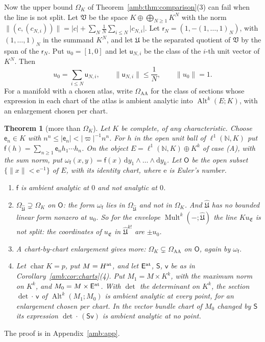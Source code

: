 \documentclass[11pt]{amsart}
\newtheorem{theorem}{Theorem}[section]
\theoremstyle{definition}
\theoremstyle{remark}
\numberwithin{equation}{section}
\newcommand{\N}{\mathbb N}
\newcommand{\Alt}{\operatorname{Alt}}
\newcommand{\Mult}{\operatorname{Mult}}
\newcommand{\abs}[1]{\lvert #1\rvert}
\newcommand{\norm}[1]{\lVert #1\rVert}
\theoremstyle{plain}
\theoremstyle{definition}
\theoremstyle{plain}
\begin{document}
Now the upper bound $\Omega_K$ of Theorem~\ref{amb:thm:comparison}(3) can fail when the line is not split. Let $\mathfrak V$ be the space $K\oplus\bigoplus_{N\ge1}K^N$ with the norm $\norm{(c,(c_{N,i}))}=\abs c+\sum_N\frac1N\sum_{i\le N}\abs{c_{N,i}}$. Let $\mathsf r_N=(1,-(1,\dots,1)_N)$, with $(1,\dots,1)_N$ in the summand $K^N$, and let $\mathfrak U$ be the separated quotient of $\mathfrak V$ by the span of the $\mathsf r_N$. Put $u_0=[1,0]$ and let $\mathsf u_{N,i}$ be the class of the $i$-th unit vector of $K^N$. Then
\begin{equation}\label{amb:c:frakU}
 u_0=\sum_{i\le N}\mathsf u_{N,i},\qquad\norm{\mathsf u_{N,i}}\le\frac1N,\qquad\norm{u_0}=1.
\end{equation}
For a manifold with a chosen atlas, write $\Omega_{\mathrm{AA}}$ for the class of sections whose expression in each chart of the atlas is ambient analytic into $\Alt^k(E;K)$, with an enlargement chosen per chart.

\begin{theorem}[more than $\Omega_K$]\label{amb:thm:more}
Let $K$ be complete, of any characteristic. Choose $\mathsf e_n\in K$ with $n^n\le\abs{\mathsf e_n}<\abs\varpi^{-1}n^n$. For $h$ in the open unit ball of $\ell^1(\N,K)$ put $\mathsf f(h)=\sum_{n\ge1}\mathsf e_nh_1\cdots h_n$. On the object $E=\ell^1(\N,K)\oplus K^k$ of case (A), with the sum norm, put $\omega_{\mathsf f}(x,y)=\mathsf f(x)\,\mathrm dy_1\wedge\dots\wedge\mathrm dy_k$. Let $\mathsf O$ be the open subset $\{\norm x<\mathrm e^{-1}\}$ of $E$, with its identity chart, where $\mathrm e$ is Euler's number.
\begin{enumerate}
\item $\mathsf f$ is ambient analytic at $0$ and not analytic at $0$.
\item $\Omega_{\widehat{\mathfrak U}}\supsetneq\Omega_K$ on $\mathsf O$: the form $\omega_{\mathsf f}$ lies in $\Omega_{\widehat{\mathfrak U}}$ and not in $\Omega_K$. And $\widehat{\mathfrak U}$ has no bounded linear form nonzero at $u_0$. So for the envelope $\Mult^k(-;\widehat{\mathfrak U})$ the line $Ku_{\mathfrak E}$ is not split: the coordinates of $u_{\mathfrak E}$ in $\widehat{\mathfrak U}^{k!}$ are $\pm u_0$.
\item A chart-by-chart enlargement gives more: $\Omega_K\subsetneq\Omega_{\mathrm{AA}}$ on $\mathsf O$, again by $\omega_{\mathsf f}$.
\item Let $\operatorname{char}K=p$, put $M=H^{\rm at}$, and let $\mathsf E^{\rm at}$, $\mathsf S$, $\mathsf v$ be as in Corollary~\ref{amb:cor:charts}(4). Put $M_1=M\times K^k$, with the maximum norm on $K^k$, and $M_0=M\times\mathsf E^{\rm at}$. With $\det$ the determinant on $K^k$, the section $\det\cdot\,\mathsf v$ of $\Alt^k(M_1;M_0)$ is ambient analytic at every point, for an enlargement chosen per chart. In the vector bundle chart of $M_0$ changed by $\mathsf S$ its expression $\det\cdot\,(\mathsf S\mathsf v)$ is ambient analytic at no point.
\end{enumerate}
\end{theorem}
The proof is in Appendix~\ref{amb:app}.
\end{document}
